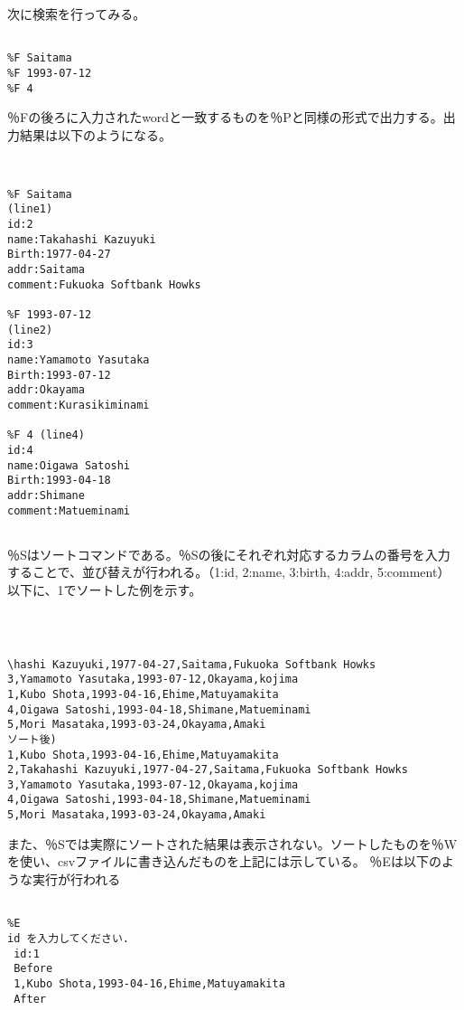 \documentclass[a4j]{jarticle}
\begin{document}
次に検索を行ってみる。

{\baselineskip 3mm
\begin{verbatim}

%F Saitama
%F 1993-07-12
%F 4

\end{verbatim}
}

％Fの後ろに入力されたwordと一致するものを％Pと同様の形式で出力する。出力結果は以下のようになる。

{\baselineskip 3mm
\begin{verbatim}


%F Saitama
(line1)
id:2
name:Takahashi Kazuyuki
Birth:1977-04-27
addr:Saitama
comment:Fukuoka Softbank Howks

%F 1993-07-12
(line2)
id:3
name:Yamamoto Yasutaka
Birth:1993-07-12
addr:Okayama
comment:Kurasikiminami

%F 4 (line4)
id:4
name:Oigawa Satoshi
Birth:1993-04-18
addr:Shimane
comment:Matueminami


\end{verbatim}
}

％Sはソートコマンドである。％Sの後にそれぞれ対応するカラムの番号を入力することで、並び替えが行われる。（1:id, 2:name, 3:birth, 4:addr, 5:comment）以下に、1でソートした例を示す。


{\baselineskip 3mm
\begin{verbatim}



\hashi Kazuyuki,1977-04-27,Saitama,Fukuoka Softbank Howks
3,Yamamoto Yasutaka,1993-07-12,Okayama,kojima
1,Kubo Shota,1993-04-16,Ehime,Matuyamakita
4,Oigawa Satoshi,1993-04-18,Shimane,Matueminami
5,Mori Masataka,1993-03-24,Okayama,Amaki
ソート後)
1,Kubo Shota,1993-04-16,Ehime,Matuyamakita
2,Takahashi Kazuyuki,1977-04-27,Saitama,Fukuoka Softbank Howks
3,Yamamoto Yasutaka,1993-07-12,Okayama,kojima
4,Oigawa Satoshi,1993-04-18,Shimane,Matueminami
5,Mori Masataka,1993-03-24,Okayama,Amaki

\end{verbatim}
}

また、％Sでは実際にソートされた結果は表示されない。ソートしたものを％Wを使い、csvファイルに書き込んだものを上記には示している。
％Eは以下のような実行が行われる

{\baselineskip 3mm
\begin{verbatim}

%E
id を入力してください.
 id:1
 Before
 1,Kubo Shota,1993-04-16,Ehime,Matuyamakita
 After

\end{verbatim}
}
\end{document}
